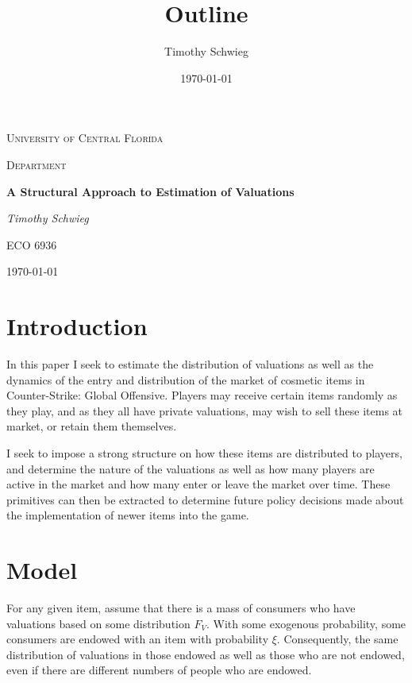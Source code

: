 \documentclass[12pt, letterpaper]{paper}
\author{Timothy Schwieg}
\date{\today}
\title{Outline}
\renewcommand\maketitle{}
\begin{document}
\maketitle


\begin{titlepage}
\centering
{\scshape\LARGE University of Central Florida\par}
\vspace{1cm}
{\scshape\Economics Department\par}
\vspace{1.5cm}
{\huge\bfseries A Structural Approach to Estimation of Valuations \par}
\vspace{2cm}
{\Large\itshape Timothy Schwieg\par}
\vfill
ECO 6936
\vfill

{\large \today\par}
\end{titlepage}


\section{Introduction}
\label{sec-1}
In this paper I seek to estimate the distribution of valuations as
well as the dynamics of the entry and distribution of the market of
cosmetic items in Counter-Strike: Global Offensive. Players may
receive certain items randomly as they play, and as they all have
private valuations, may wish to sell these items at market, or retain
them themselves. 

I seek to impose a strong structure on how these items are distributed
to players, and determine the nature of the valuations as well as how
many players are active in the market and how many enter or leave the
market over time. These primitives can then be extracted to determine
future policy decisions made about the implementation of newer items
into the game.

\section{Model}
\label{sec-2}

For any given item, assume that there is a mass of consumers who have
valuations based on some distribution $F_V$. With some exogenous
probability, some consumers are endowed with an item with probability
$\xi$. Consequently, the same distribution of valuations in those
endowed as well as those who are not endowed, even if there are
different numbers of people who are endowed. 
\end{document}
